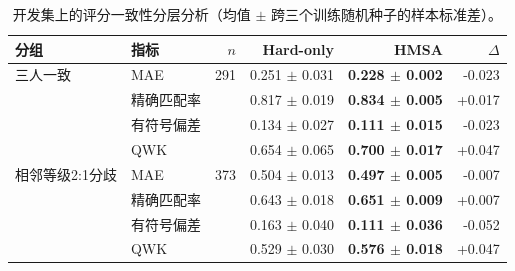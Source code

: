 \begin{table}[H]
\centering
\caption{开发集上的评分一致性分层分析（均值 $\pm$ 跨三个训练随机种子的样本标准差）。}
\label{tab:dev_disagreement}
\small
\begin{tabular}{llrrrr}
\toprule
分组 & 指标 & $n$ & Hard-only & HMSA & $\Delta$ \\
\midrule
三人一致 & MAE & 291 & 0.251 $\pm$ 0.031 & \textbf{0.228 $\pm$ 0.002} & -0.023 \\
 & 精确匹配率 &  & 0.817 $\pm$ 0.019 & \textbf{0.834 $\pm$ 0.005} & +0.017 \\
 & 有符号偏差 &  & 0.134 $\pm$ 0.027 & \textbf{0.111 $\pm$ 0.015} & -0.023 \\
 & QWK &  & 0.654 $\pm$ 0.065 & \textbf{0.700 $\pm$ 0.017} & +0.047 \\
\midrule
相邻等级2:1分歧 & MAE & 373 & 0.504 $\pm$ 0.013 & \textbf{0.497 $\pm$ 0.005} & -0.007 \\
 & 精确匹配率 &  & 0.643 $\pm$ 0.018 & \textbf{0.651 $\pm$ 0.009} & +0.007 \\
 & 有符号偏差 &  & 0.163 $\pm$ 0.040 & \textbf{0.111 $\pm$ 0.036} & -0.052 \\
 & QWK &  & 0.529 $\pm$ 0.030 & \textbf{0.576 $\pm$ 0.018} & +0.047 \\
\bottomrule
\end{tabular}
\end{table}
